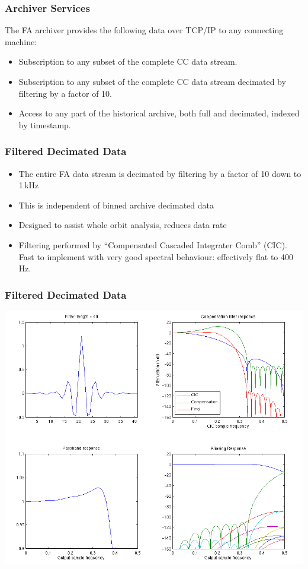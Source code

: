 \documentclass{beamer}
\begin{document}
\begin{frame}\frametitle{Archiver Services}

The FA archiver provides the following data over TCP/IP to any connecting
machine:

\begin{itemize}

\item Subscription to any subset of the complete CC data stream.

\item Subscription to any subset of the complete CC data stream decimated by
filtering by a factor of 10.

\item Access to any part of the historical archive, both full and decimated,
indexed by timestamp.

\end{itemize}
\end{frame}



\begin{frame}\frametitle{Filtered Decimated Data}
\begin{itemize}
\item The entire FA data stream is decimated by filtering by a factor of 10 down
to 1\,kHz
\item This is independent of binned archive decimated data
\item Designed to assist whole orbit analysis, reduces data rate
\item Filtering performed by ``Compensated Cascaded Integrater Comb'' (CIC).
Fast to implement with very good spectral behaviour: effectively flat to
400\,Hz.
\end{itemize}
\begin{center}

\end{center}
\end{frame}


\begin{frame}\frametitle{Filtered Decimated Data}
\begin{center}
\includegraphics[width=0.8\linewidth]{filter}
\end{center}
\end{frame}
\end{document}
